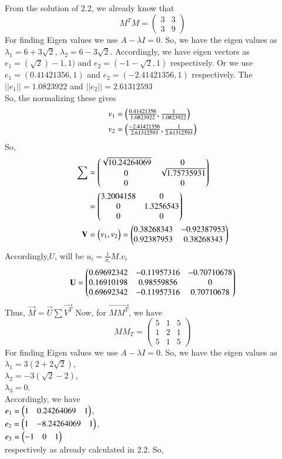 \documentclass[journal,12pt,twocolumn]{IEEEtran}
\renewcommand\thesection{\arabic{section}}
\begin{document}
\begin{enumerate}[label=\thesection.\arabic*.,ref=\thesection.\theenumi]
\solution\\
From the solution of 2.2, we already know that 
$$
M^TM=\begin{pmatrix}
3 & 3\\
3 & 9
\end{pmatrix}
$$
For finding Eigen values we use $A-\lambda I=0$. So, we have the eigen values as\\
$\lambda_1=6+3\sqrt{2}$, $\lambda_2=6-3\sqrt{2}$.
Accordingly, we have eigen vectors as $e_1=(\sqrt{2})-1,1)$ and $e_2=(-1-\sqrt{2},1)$ respectively. Or we use $e_1=(0.41421356,1)$ and $e_2=(-2.41421356,1)$ respectively. The $||e_1||=1.0823922$ and $||e_2||=2.61312593$\\
So, the normalizing these gives 
\begin{align*}
&v_1=\begin{pmatrix}\frac{0.41421356}{1.0823922},\frac{1}{1.0823922}\end{pmatrix}\\
&v_2=\begin{pmatrix}\frac{-2.41421356}{2.61312593},\frac{1}{2.61312593}\end{pmatrix}
\end{align*}
So,
\begin{align*}
\sum&=\begin{pmatrix}\sqrt{10.24264069}	& 0\\0 & \sqrt{1.75735931}\\ 0 & 0\end{pmatrix} \\
&=\begin{pmatrix}3.2004158& 0\\0 & 1.3256543\\ 0 & 0\end{pmatrix}\\
\mathbf{V}&=\begin{pmatrix}v_1,v_2\end{pmatrix}=\begin{pmatrix}0.38268343 & -0.92387953\\ 0.92387953	& 0.38268343\end{pmatrix}\\
\end{align*} 
Accordingly,$U$, will be $u_i=\frac{1}{\sigma_i}M.v_i$
\begin{align*}
\mathbf{U}=\begin{pmatrix}	0.69692342	& -0.11957316 & -0.70710678\\	
	0.16910198	& 0.98559856 & 0	\\
	0.69692342	&-0.11957316	& 0.70710678\end{pmatrix}
\end{align*}
Thus, $\vec{M}=\vec{U}\sum \vec{V^T}$
Now, for $\vec{MM^T}$, we have
 $$
MM_T=\begin{pmatrix}
5 & 1& 5\\
1 & 2& 1\\
5 &1 & 5
\end{pmatrix}
$$
For finding Eigen values we use $A-\lambda I=0$. So, we have the eigen values as\\
$\lambda_1=3(2+2\sqrt{2})$,\\ $\lambda_2=-3(\sqrt{2}-2)$,\\$\lambda_3=0$.\\ Accordingly, we have\\ $e_1=\begin{pmatrix}1 & 0.24264069 & 1\end{pmatrix}$,\\$ e_2=\begin{pmatrix}1	&-8.24264069 & 1\end{pmatrix}$,\\ $e_3=\begin{pmatrix}-1 & 0 & 1\end{pmatrix}$\\ respectively as already calculated in 2.2. So, \\

\end{enumerate}
\end{document}
